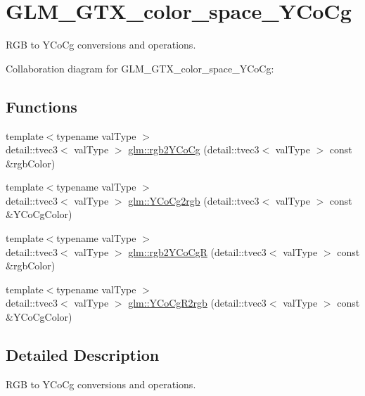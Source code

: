 \hypertarget{group__gtx__color__space___y_co_cg}{}\section{G\+L\+M\+\_\+\+G\+T\+X\+\_\+color\+\_\+space\+\_\+\+Y\+Co\+Cg}
\label{group__gtx__color__space___y_co_cg}


R\+G\+B to Y\+Co\+Cg conversions and operations.  


Collaboration diagram for G\+L\+M\+\_\+\+G\+T\+X\+\_\+color\+\_\+space\+\_\+\+Y\+Co\+Cg\+:
\subsection*{Functions}
\begin{DoxyCompactItemize}
\item 
{\footnotesize template$<$typename val\+Type $>$ }\\detail\+::tvec3$<$ val\+Type $>$ \hyperlink{group__gtx__color__space___y_co_cg_gab20f748db32bddb4827540525b07d8b3}{glm\+::rgb2\+Y\+Co\+Cg} (detail\+::tvec3$<$ val\+Type $>$ const \&rgb\+Color)
\item 
{\footnotesize template$<$typename val\+Type $>$ }\\detail\+::tvec3$<$ val\+Type $>$ \hyperlink{group__gtx__color__space___y_co_cg_ga0dd1385c2b2b56936a3abb0473c30cde}{glm\+::\+Y\+Co\+Cg2rgb} (detail\+::tvec3$<$ val\+Type $>$ const \&Y\+Co\+Cg\+Color)
\item 
{\footnotesize template$<$typename val\+Type $>$ }\\detail\+::tvec3$<$ val\+Type $>$ \hyperlink{group__gtx__color__space___y_co_cg_ga7e645d149831276186197f7afc292104}{glm\+::rgb2\+Y\+Co\+Cg\+R} (detail\+::tvec3$<$ val\+Type $>$ const \&rgb\+Color)
\item 
{\footnotesize template$<$typename val\+Type $>$ }\\detail\+::tvec3$<$ val\+Type $>$ \hyperlink{group__gtx__color__space___y_co_cg_ga732af29818632e3d280ee865439ec9f7}{glm\+::\+Y\+Co\+Cg\+R2rgb} (detail\+::tvec3$<$ val\+Type $>$ const \&Y\+Co\+Cg\+Color)
\end{DoxyCompactItemize}


\subsection{Detailed Description}
R\+G\+B to Y\+Co\+Cg conversions and operations. 


